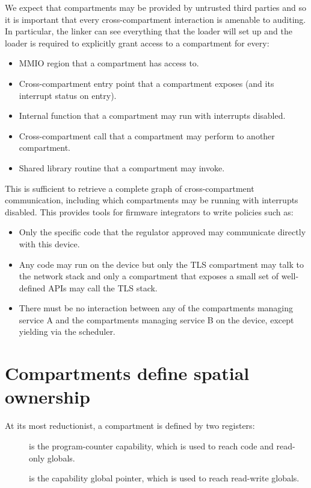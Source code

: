 We expect that compartments may be provided by untrusted third parties and so it is important that every cross-compartment interaction is amenable to auditing.
In particular, the linker can see everything that the loader will set up and the loader is required to explicitly grant access to a compartment for every:

\begin{itemize}
	\item MMIO region that a compartment has access to.
	\item Cross-compartment entry point that a compartment exposes (and its interrupt status on entry).
	\item Internal function that a compartment may run with interrupts disabled.
	\item Cross-compartment call that a compartment may perform to another compartment.
	\item Shared library routine that a compartment may invoke.
\end{itemize}

This is sufficient to retrieve a complete graph of cross-compartment communication, including which compartments may be running with interrupts disabled.
This provides tools for firmware integrators to write policies such as:

\begin{itemize}
	\item Only the specific code that the regulator approved may communicate directly with this device.
	\item Any code may run on the device but only the TLS compartment may talk to the network stack and only a compartment that exposes a small set of well-defined APIs may call the TLS stack.
	\item There must be no interaction between any of the compartments managing service A and the compartments managing service B on the device, except yielding via the scheduler.
\end{itemize}

\section{Compartments define spatial ownership}

At its most reductionist, a \cherimcuos{} compartment is defined by two registers:

\begin{description}
	\item[\PCC] is the program-counter capability, which is used to reach code and read-only globals.
	\item[\CGP] is the capability global pointer, which is used to reach read-write globals.
\end{description}

